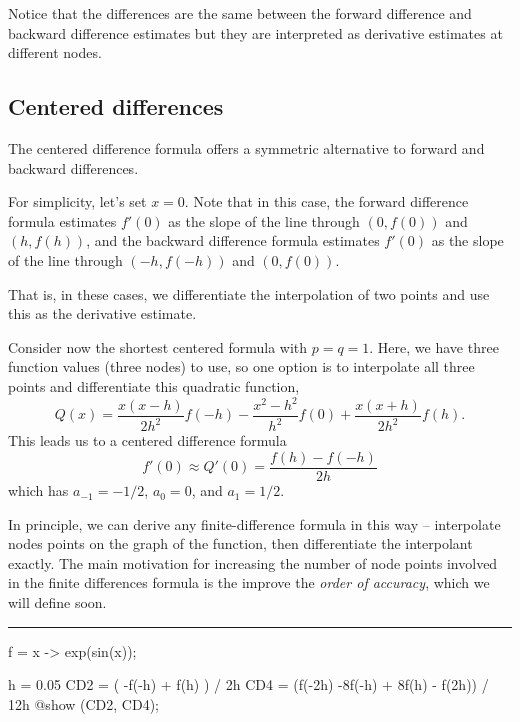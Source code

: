 \documentclass[
]{article}
\newenvironment{Shaded}{\begin{snugshade}}{\end{snugshade}}
\newcommand{\FloatTok}[1]{\textcolor[rgb]{0.68,0.00,0.00}{#1}}
\newcommand{\FunctionTok}[1]{\textcolor[rgb]{0.28,0.35,0.67}{#1}}
\newcommand{\NormalTok}[1]{\textcolor[rgb]{0.00,0.23,0.31}{#1}}
\newcommand{\OperatorTok}[1]{\textcolor[rgb]{0.37,0.37,0.37}{#1}}
\newcommand{\PreprocessorTok}[1]{\textcolor[rgb]{0.68,0.00,0.00}{#1}}
\begin{document}
Notice that the differences are the same between the forward difference
and backward difference estimates but they are interpreted as derivative
estimates at different nodes.

\subsection{Centered differences}\label{centered-differences}

{The centered difference formula offers a symmetric alternative to
forward and backward differences.}

For simplicity, let's set \(x = 0\). Note that in this case, the forward
difference formula estimates \(f'(0)\) as the slope of the line through
\((0,f(0))\) and \((h,f(h))\), and the backward difference formula
estimates \(f'(0)\) as the slope of the line through \((-h,f(-h))\) and
\((0,f(0))\).

{That is, in these cases, we differentiate the interpolation of two
points and use this as the derivative estimate.}

Consider now the shortest centered formula with \(p = q = 1\). Here, we
have three function values (three nodes) to use, so one option is to
interpolate all three points and differentiate this quadratic function,
\[Q(x) = \frac{x(x-h)}{2h^2} f(-h) - \frac{x^2 - h^2}{h^2} f(0) + \frac{x(x+h)}{2h^2}f(h).\]
This leads us to a centered difference formula
\[f'(0) \approx Q'(0) = \frac{f(h) - f(-h)}{2h}\] which has
\(a_{-1} = -1/2\), \(a_0 = 0\), and \(a_1 = 1/2\).

{In principle, we can derive any finite-difference formula in this way
-- interpolate nodes points on the graph of the function, then
differentiate the interpolant exactly. The main motivation for
increasing the number of node points involved in the finite differences
formula is the improve the \emph{order of accuracy}, which we will
define soon.}

\begin{center}\rule{0.5\linewidth}{0.5pt}\end{center}

\begin{Shaded}
\begin{Highlighting}[]
\NormalTok{f }\OperatorTok{=}\NormalTok{ x }\OperatorTok{{-}\textgreater{}} \FunctionTok{exp}\NormalTok{(}\FunctionTok{sin}\NormalTok{(x));}

\NormalTok{h }\OperatorTok{=} \FloatTok{0.05}
\NormalTok{CD2 }\OperatorTok{=}\NormalTok{ (         }\FunctionTok{{-}f}\NormalTok{(}\OperatorTok{{-}}\NormalTok{h)  }\OperatorTok{+}   \FunctionTok{f}\NormalTok{(h)         ) }\OperatorTok{/} \FloatTok{2}\NormalTok{h}
\NormalTok{CD4 }\OperatorTok{=}\NormalTok{ (}\FunctionTok{f}\NormalTok{(}\OperatorTok{{-}}\FloatTok{2}\NormalTok{h)   }\FunctionTok{{-}8f}\NormalTok{(}\OperatorTok{{-}}\NormalTok{h) }\OperatorTok{+}   \FloatTok{8}\FunctionTok{f}\NormalTok{(h) }\OperatorTok{{-}} \FunctionTok{f}\NormalTok{(}\FloatTok{2}\NormalTok{h)) }\OperatorTok{/} \FloatTok{12}\NormalTok{h}
\PreprocessorTok{@show}\NormalTok{ (CD2, CD4);}
\end{Highlighting}
\end{Shaded}
\end{document}
